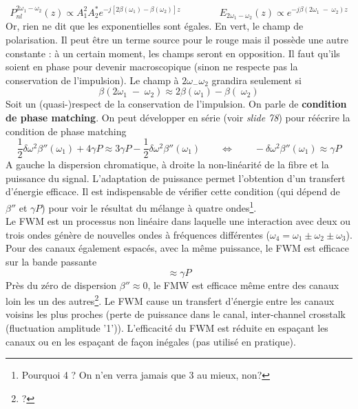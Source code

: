 \begin{equation}
P_{nl}^{2{\omega _1} - {\omega _2}}(z) \propto A_1^2A_2^*{e^{ - j[2\beta ({\omega _1}) - \beta ({\omega _2})]z}}\qquad\qquad
{E_{2{\omega _1} - {\omega _2}}}(z) \propto {e^{ - j\beta (2{\omega _1}\; - \;{\omega _2})z}}
\end{equation}
Or, rien ne dit que les exponentielles sont égales.  En vert, le champ de polarisation. Il peut
être un terme source pour le rouge mais il possède une autre constante : à un certain moment, 
les champs seront en opposition. Il faut qu'ils soient en phase pour devenir macroscopique 
(sinon ne respecte pas la conservation de l'impulsion). Le champ à $2\omega_-\omega_2$ grandira
seulement si
\begin{equation}
\beta (2{\omega _1}\; - \;{\omega _2}) \approx 2\beta ({\omega _1}) - \beta (\;{\omega _2})
\end{equation}
Soit un (quasi-)respect de la conservation de l'impulsion. On parle de \textbf{condition de 
phase matching}. On peut développer en série (voir \textit{slide 78}) pour réécrire la condition 
de phase matching
\begin{equation}
\frac{1}{2}\delta {\omega ^2}\beta ''({\omega _1}) + 4\gamma P \approx 3\gamma P - \frac{1}{2}\delta {\omega ^2}\beta ''({\omega _1})\qquad\Leftrightarrow\qquad
 - \delta {\omega ^2}\beta ''({\omega _1}) \approx \gamma P
\end{equation}
A gauche la dispersion chromatique, à droite la non-linéarité de la fibre et la puissance du 
signal. L'adaptation de puissance permet l'obtention d'un transfert d'énergie efficace. Il est
indispensable de vérifier cette condition (qui dépend de $\beta''$ et $\gamma P$) pour voir le
résultat du mélange à quatre ondes\footnote{Pourquoi 4 ? On n'en verra jamais que 3 au mieux, non?}.\\

Le FWM est un processus non linéaire dans laquelle une interaction avec deux ou trois ondes génère
de nouvelles ondes à fréquences différentes ($\omega_4=\omega_1\pm\omega_2\pm\omega_3$). Pour
des canaux également espacés, avec la même puissance, le FWM est efficace sur la bande passante
\begin{equation}
[\delta {\omega ^2}\beta ''] \approx \gamma P
\end{equation}
Près du zéro de dispersion $\beta''\approx0$, le FMW est efficace même entre des canaux loin
les un des autres\footnote{?}. Le FWM cause un transfert d'énergie entre les canaux voisins les
plus proches (perte de puissance dans le canal, inter-channel crosstalk (fluctuation amplitude
'1')). L'efficacité du FWM est réduite en espaçant les canaux ou en les espaçant de façon
inégales (pas utilisé en pratique).

